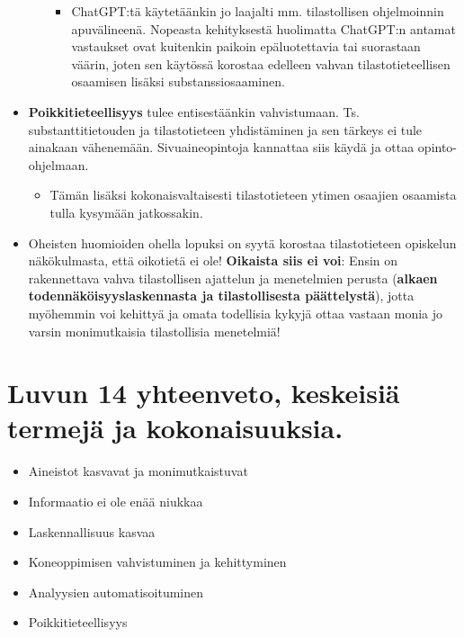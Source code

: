 \documentclass[
]{book}
\providecommand{\tightlist}{%
  \setlength{\itemsep}{0pt}\setlength{\parskip}{0pt}}
\begin{document}
\begin{itemize}
\begin{itemize}
    \begin{itemize}
    \tightlist
    \item
      ChatGPT:tä käytetäänkin jo laajalti mm. tilastollisen ohjelmoinnin apuvälineenä. Nopeasta kehityksestä huolimatta ChatGPT:n antamat vastaukset ovat kuitenkin paikoin epäluotettavia tai suorastaan väärin, joten sen käytössä korostaa edelleen vahvan tilastotieteellisen osaamisen lisäksi substanssiosaaminen.
    \end{itemize}
  \end{itemize}
\item
  \textbf{Poikkitieteellisyys} tulee entisestäänkin vahvistumaan. Ts. substanttitietouden ja tilastotieteen yhdistäminen ja sen tärkeys ei tule ainakaan vähenemään. Sivuaineopintoja kannattaa siis käydä ja ottaa opinto-ohjelmaan.

  \begin{itemize}
  \tightlist
  \item
    Tämän lisäksi kokonaisvaltaisesti tilastotieteen ytimen osaajien osaamista tulla kysymään jatkossakin.
  \end{itemize}
\end{itemize}

\hfill\break

\begin{itemize}
\tightlist
\item
  Oheisten huomioiden ohella lopuksi on syytä korostaa tilastotieteen opiskelun näkökulmasta, että oikotietä ei ole! \textbf{Oikaista siis ei voi}: Ensin on rakennettava vahva tilastollisen ajattelun ja menetelmien perusta (\textbf{alkaen todennäköisyyslaskennasta ja tilastollisesta päättelystä}), jotta myöhemmin voi kehittyä ja omata todellisia kykyjä ottaa vastaan monia jo varsin monimutkaisia tilastollisia menetelmiä!
\end{itemize}

\hypertarget{luvun-14-yhteenveto-keskeisiuxe4-termejuxe4-ja-kokonaisuuksia.}{%
\section{Luvun 14 yhteenveto, keskeisiä termejä ja kokonaisuuksia.}\label{luvun-14-yhteenveto-keskeisiuxe4-termejuxe4-ja-kokonaisuuksia.}}

\begin{itemize}
\tightlist
\item
  Aineistot kasvavat ja monimutkaistuvat
\item
  Informaatio ei ole enää niukkaa
\item
  Laskennallisuus kasvaa
\item
  Koneoppimisen vahvistuminen ja kehittyminen
\item
  Analyysien automatisoituminen
\item
  Poikkitieteellisyys
\end{itemize}

  
\end{document}

